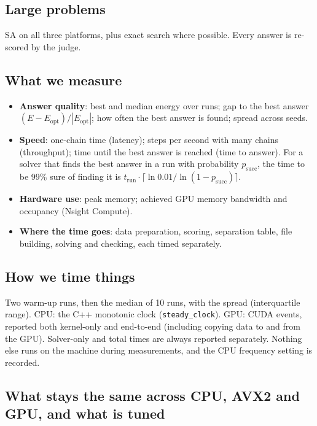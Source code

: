 \subsection{Large problems}

SA on all three platforms, plus exact search where possible. Every answer is re-scored by the judge.

\subsection{What we measure}

\begin{itemize}
\item \textbf{Answer quality}: best and median energy over runs; gap to the best answer $(E-E_{\text{opt}})/|E_{\text{opt}}|$; how often the best answer is found; spread across seeds.
\item \textbf{Speed}: one-chain time (latency); steps per second with many chains (throughput); time until the best answer is reached (time to answer). For a solver that finds the best answer in a run with probability $p_{\text{succ}}$, the time to be 99\% sure of finding it is $t_{\text{run}}\cdot\lceil\ln 0.01/\ln(1-p_{\text{succ}})\rceil$.
\item \textbf{Hardware use}: peak memory; achieved GPU memory bandwidth and occupancy (Nsight Compute).
\item \textbf{Where the time goes}: data preparation, scoring, separation table, file building, solving and checking, each timed separately.
\end{itemize}

\subsection{How we time things}

Two warm-up runs, then the median of 10 runs, with the spread (interquartile range). CPU: the C++ monotonic clock (\texttt{steady\_clock}). GPU: CUDA events, reported both kernel-only and end-to-end (including copying data to and from the GPU). Solver-only and total times are always reported separately. Nothing else runs on the machine during measurements, and the CPU frequency setting is recorded.

\subsection{What stays the same across CPU, AVX2 and GPU, and what is tuned}

